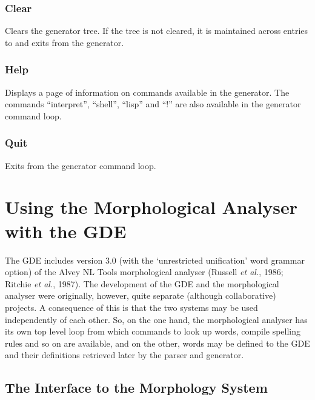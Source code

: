 \subsection{Clear}

Clears the generator tree. If the tree is not cleared, it is maintained
across entries to and exits from the generator.

\subsection{Help}

Displays a page of information on commands available in the generator.
The commands ``interpret'', ``shell'', ``lisp'' and ``!'' are also available
in the generator command loop.

\subsection{Quit}

Exits from the generator command loop.


\chapter{Using the Morphological Analyser with the GDE}

The GDE includes version 3.0 (with the `unrestricted unification' word
grammar option) of the Alvey NL Tools morphological
analyser (Russell {\it et al.}, 1986; Ritchie {\it et al.}, 1987).
The development of the GDE and the morphological analyser were
originally, however, quite separate (although collaborative)
projects. A consequence of this is that the two systems may be used
independently of each other.  So, on the one hand, the morphological
analyser has its own top level loop from which commands to look up
words, compile spelling rules and so on are available, and on the other,
words may be defined to the GDE and their definitions retrieved
later by the parser and generator.

\section{The Interface to the Morphology System}


